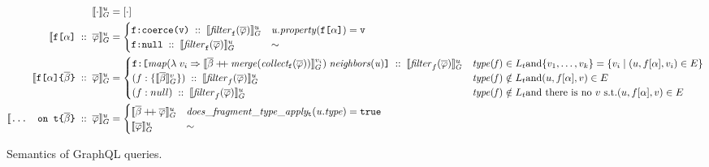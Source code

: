 \begin{figure}[h]
\small
    \centering
    \begin{align}
    \llbracket \cdot \rrbracket^{u}_{G} &= [\cdot] \\
    \llbracket \texttt{f[}\alpha\texttt{]}\; ::\; \overline{\varphi} \rrbracket^{u}_{G} &= \begin{cases}
    \texttt{f}\texttt{:}\texttt{coerce(\texttt{v})} \; ::\; \llbracket \mathit{filter}_{\texttt{f}}(\overline{\varphi}) \rrbracket^{u}_{G}  & \mathit{u.property}(\texttt{f[}\alpha\texttt{]}) = \texttt{v} \\
    \texttt{f}\texttt{:}\texttt{null} \; :: \; \llbracket \mathit{filter}_{\texttt{f}}(\overline{\varphi}) \rrbracket^{u}_{G} & \sim
    \end{cases}\\
    \llbracket \texttt{f[}\alpha\texttt{]} \texttt{\{}\overline{\beta}\texttt{\}} \; ::\; \overline{\varphi} \rrbracket^{u}_{G} &=
    \begin{cases}
    \texttt{f}\texttt{:}\texttt{[} \mathit{map} (\lambda\; v_{i} \Rightarrow \llbracket \overline{\beta} \mathbin{+\mkern-5mu+} \mathit{merge (collect_{\texttt{f}} (\overline{\varphi}))} \rrbracket^{v_{i}}_{G})\; \mathit{neighbors(u)} \texttt{]} \; :: \; \llbracket \mathit{filter}_{f}(\overline{\varphi}) \rrbracket^{u}_{G}  & \mathit{type(f)} \in L_{t} \text{and} \{v_{1}, \ldots, v_{k}\} = \{v_{i} \mid (u, f[\alpha], v_{i}) \in E\} \\
    (f:\{\llbracket \overline{\beta} \rrbracket^{v}_{G}\})\; :: \; \llbracket \mathit{filter}_{f}(\overline{\varphi}) \rrbracket^{u}_{G}  & \mathit{type(f)} \notin L_{t} \text{and} (u, f[\alpha], v) \in E \\
    (f:null)\; :: \; \llbracket \mathit{filter}_{f}(\overline{\varphi}) \rrbracket^{u}_{G} & \mathit{type(f)} \notin L_{t} \text{and there is no } v \text{ s.t.} (u, f[\alpha], v) \in E \\
    \end{cases}\\
    \llbracket \texttt{... on t}\texttt{\{}\overline{\beta}\texttt{\}}\; ::\; \overline{\varphi} \rrbracket^{u}_{G} &= \begin{cases}
    \llbracket \overline{\beta} \mathbin{+\mkern-5mu+} \overline{\varphi} \rrbracket^{u}_{G} & \mathit{does\_fragment\_type\_apply_{\texttt{t}}(u.type)} = \texttt{true}\\
    \llbracket \overline{\varphi} \rrbracket^{u}_{G} & \sim
    \end{cases}
    \end{align}
    \caption{Semantics of GraphQL queries. }
    \label{fig:semantics}
\end{figure}


